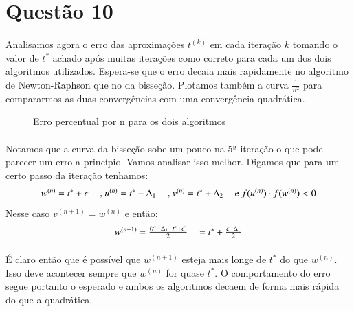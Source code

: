 \documentclass[a4paper,11pt]{article}
\begin{document}
\newpage
\section*{Questão 10}
\paragraph{}Analisamos agora o erro das aproximações $t^{(k)}$ em cada iteração $k$ tomando o valor de $t^*$ achado após muitas iterações como correto para cada um dos dois algoritmos utilizados. Espera-se que o erro decaia mais rapidamente no algoritmo de Newton-Raphson que no da bisseção. Plotamos também a curva $\frac{1}{n^2}$ para compararmos as duas convergências com uma convergência quadrática.

\FloatBarrier
\begin{figure}[!htp]
	\centering
	
	\caption{Erro percentual por n para os dois algoritmos}
	\label{}
\end{figure} 
\FloatBarrier

\paragraph{}Notamos que a curva da bisseção sobe um pouco na 5ª iteração o que pode parecer um erro a princípio. Vamos analisar isso melhor. Digamos que para um certo passo da iteração tenhamos:
\begin{displaymath}
\begin{tabular}{llll}
$w^{(n)} = t^* + \epsilon$ &, $u^{(n)} = t^* - \Delta _1 $ &, $v^{(n)} = t^* + \Delta _2 $ & e $f(u^{(n)}) \cdot f(w^{(n)}) < 0$
\end{tabular}
\end{displaymath}  Nesse caso $v^{(n+1)} = w^{(n)}$ e então:
	\begin{displaymath}
		\begin{tabular}{ll}
			$w^{(n+1)} = \frac{(t^* - \Delta_1 + t^* + \epsilon)}{2} $ & $= t^* + \frac{\epsilon - \Delta_1}{2}$
		\end{tabular}
	\end{displaymath}
	
	\paragraph{}É claro então que é possível que $w^{(n+1)}$ esteja mais longe de $t^*$ do que $w^{(n)}$. Isso deve acontecer sempre que $w^{(n)}$ for quase $t^*$. O comportamento do erro segue portanto o esperado e ambos os algoritmos decaem de forma   mais rápida do que a quadrática. 
\newpage
\end{document}
